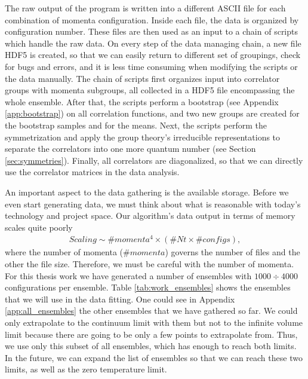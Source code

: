 The raw output of the program is written into a different ASCII file for each combination of momenta configuration. Inside each file, the data is organized by configuration number. These files are then used as an input to a chain of scripts which handle the raw data. On every step of the data managing chain, a new file HDF5 is created, so that we can easily return to different set of groupings, check for bugs and errors, and it is less time consuming when modifying the scripts or the data manually. The chain of scripts first organizes input into correlator groups with momenta subgroups, all collected in a HDF5 file encompassing the whole ensemble. After that, the scripts perform a bootstrap (see Appendix \ref{app:bootstrap}) on all correlation functions, and two new groups are created for the bootstrap samples and for the means. Next, the scripts perform the symmetrization and apply the group theory's irreducible representations to separate the correlators into one more quantum number (see Section \ref{sec:symmetries}). Finally, all correlators are diagonalized, so that we can directly use the correlator matrices in the data analysis.

An important aspect to the data gathering is the available storage. Before we even start generating data, we must think about what is reasonable with today's technology and project space. Our algorithm's data output in terms of memory scales quite poorly
\begin{equation}
    \begin{aligned}
        Scaling \sim \#momenta^{4} \times \left( \#Nt \times \#configs \right),
    \end{aligned}
\end{equation}
where the number of momenta ($\#momenta$) governs the number of files and the other the file size. Therefore, we must be careful with the number of momenta. For this thesis work we have generated a number of ensembles with $1000 \div  4000$ configurations per ensemble. Table \ref{tab:work_ensembles} shows the ensembles that we will use in the data fitting. One could see in Appendix \ref{app:all_ensembles} the other ensembles that we have gathered so far. We could only extrapolate to the continuum limit with them but not to the infinite volume limit because there are going to be only a few points to extrapolate from. Thus, we use only this subset of all ensembles, which has enough to reach both limits. In the future, we can expand the list of ensembles so that we can reach these two limits, as well as the zero temperature limit.

